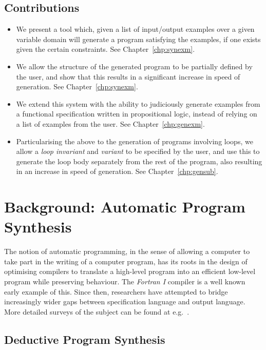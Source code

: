 \documentclass[a4paper,twoside,notitlepage]{report}
\begin{document}
\section{Contributions}
\begin{itemize}
    \item We present a tool which, given a list of input/output examples 
    over a given variable domain will generate a program satisfying the
    examples, if one exists given the certain constraints. See 
    Chapter~\ref{chp:synexm}.

    \item We allow the structure of the generated program to be partially 
    defined by the user, and show that this results in a significant increase
    in speed of generation. See Chapter~\ref{chp:synexm}.

    \item We extend this system with the ability to judiciously generate 
    examples from a functional specification written in propositional
    logic, instead of relying on a list of examples from the user. See
    Chapter~\ref{chp:genexm}.

    \item Particularising the above to the generation of programs 
    involving loops, we allow a \emph{loop invariant} and \emph{variant}
    to be specified by the user, and use this to generate the loop body
    separately from the rest of the program, also resulting in an 
    increase in speed of generation. See Chapter~\ref{chp:gensub}.
\end{itemize}

\chapter{Background: Automatic Program Synthesis} \label{chp:bkgsyn}

The notion of automatic programming, in the sense of 
allowing a computer to take part in the writing of a computer program, has its 
roots in the design of optimising compilers to translate a high-level program 
into an efficient low-level program while preserving behaviour. The 
\emph{Fortran I} compiler\cite{fortran} is a well known early example of this. 
Since then, researchers have attempted to bridge increasingly wider gaps 
between specification language and output language. More detailed surveys of 
the subject can be found at e.g.\ 
\cite{goldberg86}\cite{deville94}\cite{basin04}.

\section{Deductive Program Synthesis}
\end{document}
